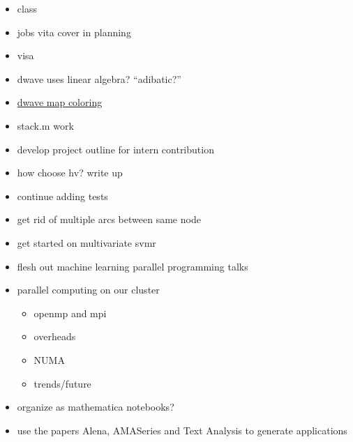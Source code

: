 \documentclass[hyperref]{labbook}
\begin{document}
\begin{itemize}
\item class
\item jobs vita  cover  in planning
\item visa
\item dwave uses linear algebra?  ``adibatic?''
\item \href{https://www.dwavesys.com/sites/default/files/Map%20Coloring%20WP2.pdf}{dwave map coloring}
\end{itemize}


\begin{itemize}
\item stack.m work
\end{itemize}


\begin{itemize}
\item develop project outline for intern contribution
\item how choose hv?  write up
\end{itemize}

\begin{itemize}
\item continue adding tests
\item get rid of multiple arcs between same node
\item get started on multivariate svmr
\end{itemize}


\begin{itemize}
\item flesh out machine learning parallel programming talks
\item parallel computing on our cluster
  \begin{itemize}
  \item openmp and mpi
  \item overheads
  \item NUMA
  \item trends/future
  \end{itemize}
\item organize as mathematica notebooks?
\item use the papers Alena, AMASeries and Text Analysis to generate applications
\end{itemize}
\end{document}
